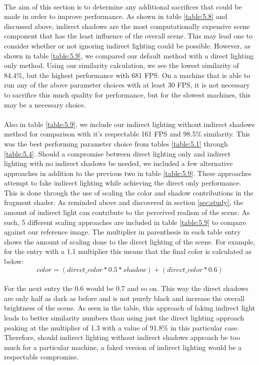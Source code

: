 \paragraph{}
The aim of this section is to determine any additional sacrifices that could be made in order to improve performance.  As shown in table \ref{table:5.8} and discussed above, indirect shadows are the most computationally expensive scene component that has the least influence of the overall scene.  This may lead one to consider whether or not ignoring indirect lighting could be possible.  However, as shown in table \ref{table:5.9}, we compared our default method with a direct lighting only method.  Using our similarity calculation, we see the lowest similarity of 84.4\%, but the highest performance with 681 FPS.  On a machine that is able to run any of the above parameter choices with at least 30 FPS, it is not necessary to sacrifice this much quality for performance, but for the slowest machines, this may be a necessary choice.

\paragraph{}
Also in table \ref{table:5.9}, we include our indirect lighting without indirect shadows method for comparison with it's respectable 161 FPS and 98.5\% similarity.  This was the best performing parameter choice from tables \ref{table:5.1} through \ref{table:5.4}.  Should a compromise between direct lighting only and indirect lighting with no indirect shadows be needed, we included a few alternative approaches in addition to the previous two in table \ref{table:5.9}.  These approaches attempt to fake indirect lighting while achieving the direct only performance.  This is done through the use of scaling the color and shadow contributions in the fragment shader.  As reminded above and discovered in section \ref{sec:study}, the amount of indirect light can contribute to the perceived realism of the scene.  As such, 5 different scaling approaches are included in table \ref{table:5.9} to compare against our reference image.  The multiplier in parenthesis in each table entry shows the amount of scaling done to the direct lighting of the scene.  For example, for the entry with a 1.1 multiplier this means that the final color is calculated as below:
\begin{equation}
color = (direct\_color*0.5*shadow)+(direct\_color*0.6)
\end{equation}

\paragraph{}
For the next entry the 0.6 would be 0.7 and so on.  This way the direct shadows are only half as dark as before and is not purely black and increase the overall brightness of the scene.  As seen in the table, this approach of faking indirect light leads to better similarity numbers than using just the direct lighting approach peaking at the multiplier of 1.3 with a value of 91.8\% in this particular case.  Therefore, should indirect lighting without indirect shadows approach be too much for a particular machine, a faked version of indirect lighting would be a respectable compromise.

